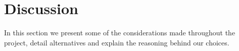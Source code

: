\section{Discussion}
\label{sec:evaluation}

In this section we present some of the considerations made throughout the project, detail alternatives and explain the reasoning behind our choices.











